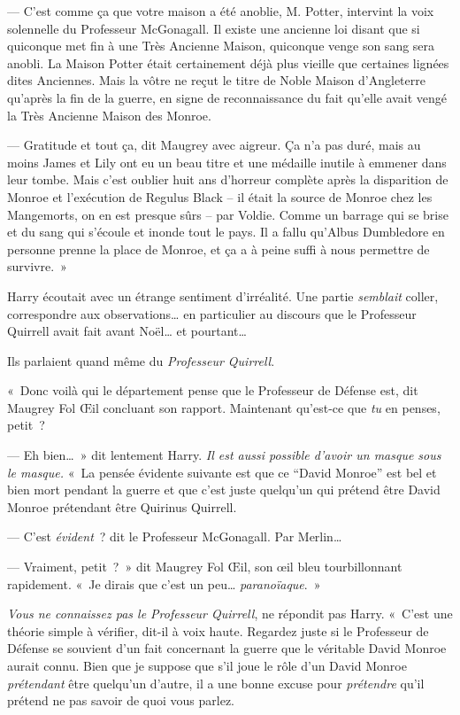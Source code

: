 --- C'est comme ça que votre maison a été anoblie, M. Potter, intervint la voix solennelle du Professeur McGonagall. Il existe une ancienne loi disant que si quiconque met fin à une Très Ancienne Maison, quiconque venge son sang sera anobli. La Maison Potter était certainement déjà plus vieille que certaines lignées dites Anciennes. Mais la vôtre ne reçut le titre de Noble Maison d'Angleterre qu'après la fin de la guerre, en signe de reconnaissance du fait qu'elle avait vengé la Très Ancienne Maison des Monroe.

--- Gratitude et tout ça, dit Maugrey avec aigreur. Ça n'a pas duré, mais au moins James et Lily ont eu un beau titre et une médaille inutile à emmener dans leur tombe. Mais c'est oublier huit ans d'horreur complète après la disparition de Monroe et l'exécution de Regulus Black -- il était la source de Monroe chez les Mangemorts, on en est presque sûrs -- par Voldie. Comme un barrage qui se brise et du sang qui s'écoule et inonde tout le pays. Il a fallu qu'Albus Dumbledore en personne prenne la place de Monroe, et ça a à peine suffi à nous permettre de survivre.~»

Harry écoutait avec un étrange sentiment d'irréalité. Une partie \emph{semblait} coller, correspondre aux observations… en particulier au discours que le Professeur Quirrell avait fait avant Noël… et pourtant…

Ils parlaient quand même du \emph{Professeur Quirrell}.

«~Donc voilà qui le département pense que le Professeur de Défense est, dit Maugrey Fol Œil concluant son rapport. Maintenant qu'est-ce que \emph{tu} en penses, petit~?

--- Eh bien…~» dit lentement Harry. \emph{Il est aussi possible d'avoir un masque sous le masque.} «~La pensée évidente suivante est que ce “David Monroe” est bel et bien mort pendant la guerre et que c'est juste quelqu'un qui prétend être David Monroe prétendant être Quirinus Quirrell.

--- C'est \emph{évident}~? dit le Professeur McGonagall. Par Merlin…

--- Vraiment, petit~?~» dit Maugrey Fol Œil, son œil bleu tourbillonnant rapidement. «~Je dirais que c'est un peu… \emph{paranoïaque}.~»

\emph{Vous ne connaissez pas le Professeur Quirrell}, ne répondit pas Harry. «~C'est une théorie simple à vérifier, dit-il à voix haute. Regardez juste si le Professeur de Défense se souvient d'un fait concernant la guerre que le véritable David Monroe aurait connu. Bien que je suppose que s'il joue le rôle d'un David Monroe \emph{prétendant} être quelqu'un d'autre, il a une bonne excuse pour \emph{prétendre} qu'il prétend ne pas savoir de quoi vous parlez.

